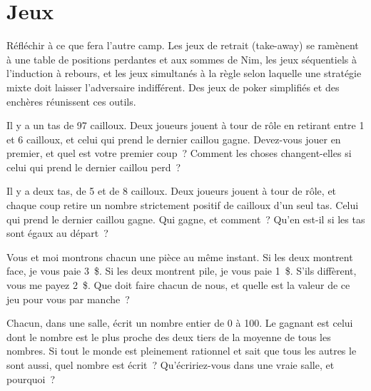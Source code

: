 \chapter{Jeux}\label{ch:iv1:games}

\begin{ivtrains}
Réfléchir à ce que fera l'autre camp. Les jeux de retrait (take-away) se ramènent à une table de positions perdantes et aux sommes de Nim, les jeux séquentiels à l'induction à rebours, et les jeux simultanés à la règle selon laquelle une stratégie mixte doit laisser l'adversaire indifférent. Des jeux de poker simplifiés et des enchères réunissent ces outils.
\end{ivtrains}

\begin{question}\label{iq:iv1:games:1}
Il y a un tas de 97 cailloux. Deux joueurs jouent à tour de rôle en retirant entre 1 et 6 cailloux, et celui qui prend le dernier caillou gagne. Devez-vous jouer en premier, et quel est votre premier coup~? Comment les choses changent-elles si celui qui prend le dernier caillou perd~?
\end{question}

\begin{question}\label{iq:iv1:games:2}
Il y a deux tas, de 5 et de 8 cailloux. Deux joueurs jouent à tour de rôle, et chaque coup retire un nombre strictement positif de cailloux d'un seul tas. Celui qui prend le dernier caillou gagne. Qui gagne, et comment~? Qu'en est-il si les tas sont égaux au départ~?
\end{question}

\begin{question}\label{iq:iv1:games:3}
Vous et moi montrons chacun une pièce au même instant. Si les deux montrent face, je vous paie 3~\$. Si les deux montrent pile, je vous paie 1~\$. S'ils diffèrent, vous me payez 2~\$. Que doit faire chacun de nous, et quelle est la valeur de ce jeu pour vous par manche~?
\end{question}

\begin{question}\label{iq:iv1:games:4}
Chacun, dans une salle, écrit un nombre entier de 0 à 100. Le gagnant est celui dont le nombre est le plus proche des deux tiers de la moyenne de tous les nombres. Si tout le monde est pleinement rationnel et sait que tous les autres le sont aussi, quel nombre est écrit~? Qu'écririez-vous dans une vraie salle, et pourquoi~?
\end{question}


